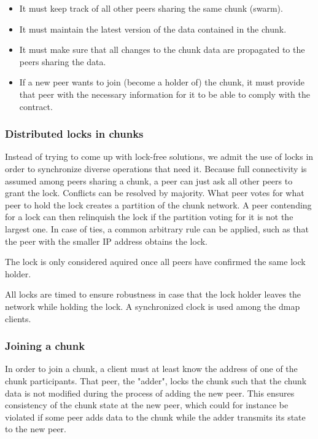 \documentclass{article}
\begin{document}
\begin{itemize}
  \itemsep0em
  \item It must keep track of all other peers sharing the same chunk (swarm).
  \item It must maintain the latest version of the data contained in the chunk.
  \item It must make sure that all changes to the chunk data are propagated to
    the peers sharing the data.
  \item If a new peer wants to join (become a holder of) the chunk, it must 
    provide that peer with the necessary information for it to be able to comply
    with the contract.
\end{itemize}

\subsubsection{Distributed locks in chunks}

Instead of trying to come up with lock-free solutions, we admit the use of
locks in order to synchronize diverse operations that need it. Because full
connectivity is assumed among peers sharing a chunk, a peer can just ask all
other peers to grant the lock. Conflicts can be resolved by majority. What peer
votes for what peer to hold the lock creates a partition of the chunk network.
A peer contending for a lock can then relinquish the lock if the partition 
voting for it is not the largest one. In case of ties, a common arbitrary rule
can be applied, such as that the peer with the smaller IP address obtains the
lock.

The lock is only considered aquired once all peers have confirmed the same lock
holder.

All locks are timed to ensure robustness in case that the lock holder leaves
the network while holding the lock. A synchronized clock is used among the
dmap clients.

\subsubsection{Joining a chunk}

In order to join a chunk, a client must at least know the address of one of the
chunk participants. That peer, the "adder", locks the chunk such that the chunk
data is not modified during the process of adding the new peer. This ensures
consistency of the chunk state at the new peer, which could for instance be
violated if some peer adds data to the chunk while the adder transmits its state
to the new peer.
\end{document}
